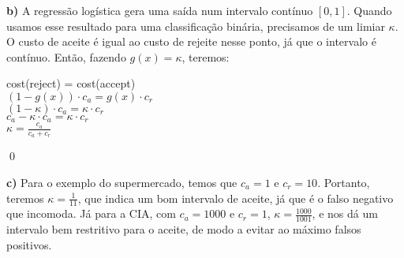 \documentclass[12pt,letterpaper]{article}
\begin{document}
	\textbf{b)} A regressão logística gera uma saída num intervalo contínuo $ [0,1] $. Quando usamos esse resultado para uma classificação binária, precisamos de um limiar $ \kappa $. O custo de aceite é igual ao custo de rejeite nesse ponto, já que o intervalo é contínuo. Então, fazendo $ g(x) = \kappa $, teremos:
	
	\begin{center}
		cost(reject) = cost(accept) \\
		$ (1-g(x)) \cdot c_a = g(x) \cdot c_r $ \\
		$ (1-\kappa) \cdot c_a = \kappa \cdot c_r $ \\
		$ c_a - \kappa \cdot c_a = \kappa \cdot c_r $ \\
		$ \kappa = \frac{c_a}{c_a + c_r} $
	\end{center}
	
	\qed
	
	\textbf{c)} Para o exemplo do supermercado, temos que $ c_a = 1 $ e $ c_r = 10 $. Portanto, teremos $ \kappa = \frac{1}{11} $, que indica um bom intervalo de aceite, já que é o falso negativo que incomoda. Já para a CIA, com $ c_a = 1000 $ e $ c_r = 1 $, $ \kappa = \frac{1000}{1001} $, e nos dá um intervalo bem restritivo para o aceite, de modo a evitar ao máximo falsos positivos.
	
\end{document}
